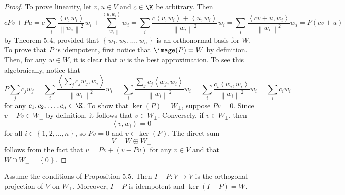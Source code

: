 \documentclass[linearalgebraII]{subfiles}
\begin{document}
    \begin{proof}
        To prove linearity, let $v,u\in V$ and $c\in\K$ be arbitrary. Then
        \begin{equation*}
            cPv + Pu = c\sum^{}_{i} \frac{\left\langle v, w_i\right\rangle }{\left\lVert w_i\right\rVert ^2}w_i + \sum^{\left\langle u, w_i\right\rangle }_{\left\lVert w_i\right\rVert } w_i = \sum^{}_{i} \frac{c\left\langle v, w_i\right\rangle + \left\langle u, w_i\right\rangle }{\left\lVert w_i\right\rVert ^2}w_i = \sum^{}_{i} \frac{\left\langle cv+u, w_i\right\rangle }{\left\lVert w_i\right\rVert ^2}w_i = P\left( cv+u \right) 
        \end{equation*}
        by Theorem 5.4, provided that $\left\lbrace w_1,w_2,\ldots,w_n \right\rbrace$ is an orthonormal basis for $W$. To prove that $P$ is idempotent, first notice that $\image(P) = W$ by definition. Then, for any $w\in W$, it is clear that $w$ is the best approximation. To see this algebraically, notice that
        \begin{equation*}
            P\sum^{}_{j} c_jw_j = \sum^{}_{i} \frac{\left\langle \sum^{}_{j} c_jw_j, w_i\right\rangle }{\left\lVert w_i\right\rVert ^2}w_i = \sum^{}_{i} \frac{\sum^{}_{j} c_j\left\langle w_j, w_i\right\rangle }{\left\lVert w_i\right\rVert ^2}w_i = \sum^{}_{i} \frac{c_i\left\langle w_i, w_i\right\rangle }{\left\lVert w_i\right\rVert ^2}w_i = \sum^{}_{i} c_iw_i 
        \end{equation*}
        for any $c_1,c_2,\ldots,c_n\in\K$. To show that $\ker(P) = W_\perp$, suppose $Pv=0$. Since $v-Pv\in W_\perp$ by definition, it follows that $v\in W_\perp$. Conversely, if $v\in W_\perp$, then
        \begin{equation*}
            \left\langle v, w_i\right\rangle = 0
        \end{equation*}
        for all $i\in\left\lbrace 1,2,\ldots,n \right\rbrace$, so $Pv = 0$ and $v\in\ker(P)$. The direct sum
        \begin{equation*}
            V = W\oplus W_\perp
        \end{equation*}
        follows from the fact that $v = Pv + \left( v-Pv \right)$ for any $v\in V$ and that $W\cap W_\perp = \left\lbrace 0 \right\rbrace $.
    \end{proof}

    \begin{cor}{}
        Assume the conditions of Proposition 5.5. Then $I-P:V\to V$ is the orthogonal projection of $V$ on $W_\perp$. Moreover, $I-P$ is idempotent and $\ker(I-P) = W$.
    \end{cor}	
\end{document}
